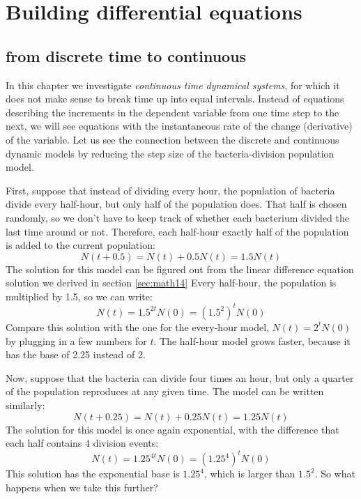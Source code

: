 \documentclass[
  letterpaper,
  DIV=11,
  numbers=noendperiod]{scrreprt}
\begin{document}
\hypertarget{building-differential-equations}{%
\section{Building differential
equations}\label{building-differential-equations}}

\label{sec:model15}

\hypertarget{from-discrete-time-to-continuous}{%
\subsection{from discrete time to
continuous}\label{from-discrete-time-to-continuous}}

In this chapter we investigate 
\emph{continuous time dynamical systems}, for which it does not make
sense to break time up into equal intervals. Instead of equations
describing the increments in the dependent variable from one time step
to the next, we will see equations with the instantaneous rate of the
change (derivative) of the variable. Let us see the connection between
the discrete and continuous dynamic models by reducing the step size of
the bacteria-division population model.

First, suppose that instead of dividing every hour,
the population of
bacteria divide every half-hour, but only half of the population does.
That half is chosen randomly, so we don't have to keep track of whether
each bacterium divided the last time around or not. Therefore, each
half-hour exactly half of the population is added to the current
population: \[ N(t+0.5) = N(t) + 0.5N(t) = 1.5N(t)\] The solution for
this model can be figured out from the linear difference equation
solution we derived in section \ref{sec:math14} Every half-hour, the
population is multiplied by 1.5, so we can write:
\[ N(t) = 1.5^{2t} N(0) = (1.5^2)^t N(0)\] Compare this solution with
the one for the every-hour model, \(N(t) = 2^t N(0)\) by plugging in a
few numbers for \(t\). The half-hour model grows faster, because it has
the base of 2.25 instead of 2.

Now, suppose that the bacteria can divide four times an hour, but only a
quarter of the population reproduces at any given time. The model can be
written similarly: \[N(t+0.25) = N(t) + 0.25N(t) = 1.25N(t)\] The
solution for this model is once again exponential, with the difference
that each half contains 4 division events:
\[N(t) = 1.25^{4t}N(0) = (1.25^4)^t N(0)\] This solution has the
exponential base is \(1.25^4\), which is larger than \(1.5^2\). So what
happens when we take this further?
\end{document}
